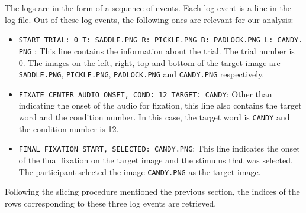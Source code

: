 \documentclass[
  a4paper,
]{article}
\providecommand{\tightlist}{%
  \setlength{\itemsep}{0pt}\setlength{\parskip}{0pt}}\usepackage{longtable,booktabs,array}
\begin{document}
The logs are in the form of a sequence of events. Each log event is a
line in the log file. Out of these log events, the following ones are
relevant for our analysis:

\begin{itemize}
\tightlist
\item
  \texttt{START\_TRIAL:\ 0\ T:\ SADDLE.PNG\ R:\ PICKLE.PNG\ B:\ PADLOCK.PNG\ L:\ CANDY.PNG}
  : This line contains the information about the trial. The trial number
  is 0. The images on the left, right, top and bottom of the target
  image are \texttt{SADDLE.PNG}, \texttt{PICKLE.PNG},
  \texttt{PADLOCK.PNG} and \texttt{CANDY.PNG} respectively.
\item
  \texttt{FIXATE\_CENTER\_AUDIO\_ONSET,\ COND:\ 12\ TARGET:\ CANDY}:
  Other than indicating the onset of the audio for fixation, this line
  also contains the target word and the condition number. In this case,
  the target word is \texttt{CANDY} and the condition number is 12.
\item
  \texttt{FINAL\_FIXATION\_START,\ SELECTED:\ CANDY.PNG}: This line
  indicates the onset of the final fixation on the target image and the
  stimulus that was selected. The participant selected the image
  \texttt{CANDY.PNG} as the target image.
\end{itemize}

Following the slicing procedure mentioned the previous section, the
indices of the rows corresponding to these three log events are
retrieved.
\end{document}
